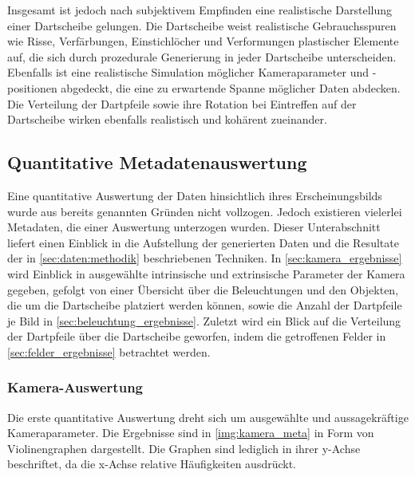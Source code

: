 Insgesamt ist jedoch nach subjektivem Empfinden eine realistische Darstellung einer Dartscheibe gelungen. Die Dartscheibe weist realistische Gebrauchsspuren wie Risse, Verfärbungen, Einstichlöcher und Verformungen plastischer Elemente auf, die sich durch prozedurale Generierung in jeder Dartscheibe unterscheiden. Ebenfalls ist eine realistische Simulation möglicher Kameraparameter und -positionen abgedeckt, die eine zu erwartende Spanne möglicher Daten abdecken. Die Verteilung der Dartpfeile sowie ihre Rotation bei Eintreffen auf der Dartscheibe wirken ebenfalls realistisch und kohärent zueinander.

\subsection{Quantitative Metadatenauswertung}
\label{sec:metadaten}

Eine quantitative Auswertung der Daten hinsichtlich ihres Erscheinungsbilds wurde aus bereits genannten Gründen nicht vollzogen. Jedoch existieren vielerlei Metadaten, die einer Auswertung unterzogen wurden. Dieser Unterabschnitt liefert einen Einblick in die Aufstellung der generierten Daten und die Resultate der in \autoref{sec:daten:methodik} beschriebenen Techniken. In \autoref{sec:kamera_ergebnisse} wird Einblick in ausgewählte intrinsische und extrinsische Parameter der Kamera gegeben, gefolgt von einer Übersicht über die Beleuchtungen und den Objekten, die um die Dartscheibe platziert werden können, sowie die Anzahl der Dartpfeile je Bild in \autoref{sec:beleuchtung_ergebnisse}. Zuletzt wird ein Blick auf die Verteilung der Dartpfeile über die Dartscheibe geworfen, indem die getroffenen Felder in \autoref{sec:felder_ergebnisse} betrachtet werden.

\subsubsection{Kamera-Auswertung}
\label{sec:kamera_ergebnisse}

Die erste quantitative Auswertung dreht sich um ausgewählte und aussagekräftige Kameraparameter. Die Ergebnisse sind in \autoref{img:kamera_meta} in Form von Violinengraphen dargestellt. Die Graphen sind lediglich in ihrer y-Achse beschriftet, da die x-Achse relative Häufigkeiten ausdrückt.

